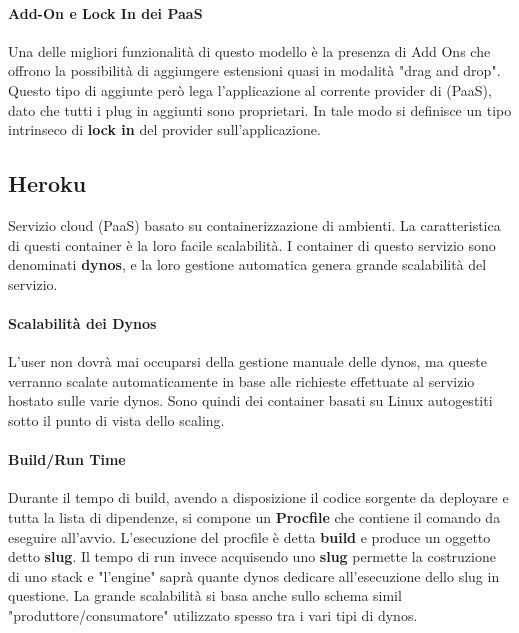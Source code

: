 \documentclass{article}
\begin{document}
\paragraph{Add-On e Lock In dei PaaS} Una delle migliori funzionalità di questo modello è la presenza di Add Ons
che offrono la possibilità di aggiungere estensioni quasi in modalità "drag and drop". Questo tipo di aggiunte però
lega l'applicazione al corrente provider di (PaaS), dato che tutti i plug in aggiunti sono proprietari. In tale modo si definisce un
tipo intrinseco di \textbf{lock in} del provider sull'applicazione.



\subsection{Heroku} Servizio cloud (PaaS) basato su containerizzazione di ambienti. La caratteristica di questi container è la loro facile scalabilità.
I container di questo servizio sono denominati \textbf{dynos}, e la loro gestione automatica genera grande
scalabilità del servizio.

\paragraph{Scalabilità dei Dynos} L'user non dovrà mai occuparsi della gestione manuale delle dynos, ma
queste verranno scalate automaticamente in base alle richieste effettuate al servizio hostato sulle varie dynos.
Sono quindi dei container basati su Linux autogestiti sotto il punto di vista dello scaling.

\paragraph{Build/Run Time} Durante il tempo di build, avendo a disposizione il codice sorgente da deployare e tutta la lista di dipendenze, si compone un \textbf{Procfile} che
contiene il comando da eseguire all'avvio. L'esecuzione del procfile è detta \textbf{build} e produce un oggetto detto \textbf{slug}.
Il tempo di run invece acquisendo uno \textbf{slug} permette la costruzione di uno stack e "l'engine" saprà quante dynos dedicare all'esecuzione dello slug in questione.
La grande scalabilità si basa anche sullo schema simil "produttore/consumatore" utilizzato spesso tra i vari tipi di dynos.
\newpage
\end{document}
